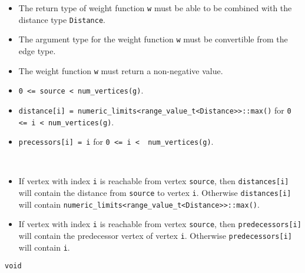 \begin{itemdescr}
      \pnum\mandates
      \begin{itemize}
            \item
                  The return type of weight function \lstinline{w} must be able to
                  be combined with the distance type \lstinline{Distance}.
            \item
                  The argument type for the weight
                  function \lstinline{w} must be convertible from the edge type.
            \item
                  The weight function \lstinline{w} must return a non-negative value.
      \end{itemize}
      \pnum\preconditions
      \begin{itemize}
            \item
                  \lstinline{0 <= source < num_vertices(g)}. 
                  \\ 
            \item
                  \lstinline{distance[i] = numeric_limits<range_value_t<Distance>>::max()}
                  for \lstinline{0 <= i < num_vertices(g)}.  
                  \\ 
            \item
                  \lstinline{precessors[i] = i} for \lstinline{0 <= i <  num_vertices(g)}.
      \end{itemize}
      \pnum\effects \\
      \pnum\result
      \begin{itemize}
            \item
                  If vertex with index \lstinline{i} is reachable from vertex \lstinline{source}, then
                  \lstinline{distances[i]} will contain the distance from \lstinline{source} to vertex
                  \lstinline{i}.  Otherwise \lstinline{distances[i]} will contain
                  \lstinline{numeric_limits<range_value_t<Distance>>::max()}.
            \item
                  If vertex with index \lstinline{i} is reachable
                  from vertex \lstinline{source}, then \lstinline{predecessors[i]} will contain the
                  predecessor vertex of vertex \lstinline{i}. Otherwise \lstinline{predecessors[i]} will contain
                  \lstinline{i}.
      \end{itemize}
      \pnum\returns \lstinline{void} \\
      \pnum\throws \\
      \pnum\complexity \\
      \pnum\remarks \\
\end{itemdescr}


